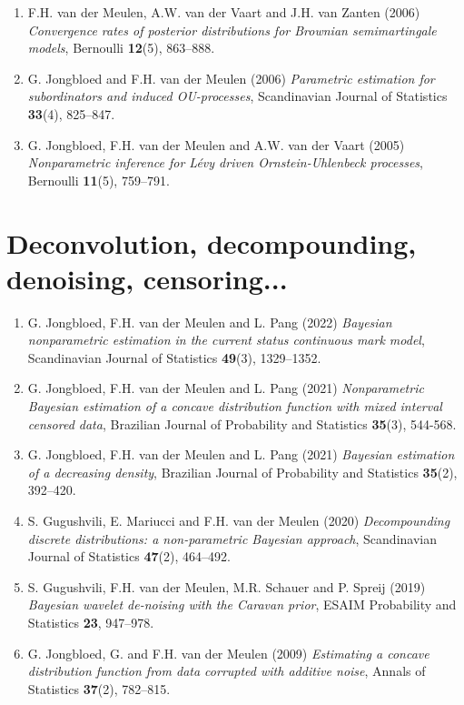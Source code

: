 \documentclass[
10pt, %
a4paper, %
oneside, %
headinclude,footinclude, %
BCOR5mm, %
]{scrartcl}
\begin{document}
\begin{enumerate}
\item {\sc F.H. van der Meulen, A.W. van der Vaart and J.H. van Zanten (2006)} {\it  Convergence rates of posterior distributions for Brownian semimartingale models}, Bernoulli {\bf 12}(5), 863--888.

\item {\sc G. Jongbloed and F.H. van der Meulen (2006)} {\it  Parametric estimation for subordinators and induced OU-processes}, Scandinavian Journal of Statistics {\bf 33}(4), 825--847.

\item {\sc G. Jongbloed, F.H. van der Meulen and A.W. van der Vaart (2005)} {\it   Nonparametric inference for L\'evy driven Ornstein-Uhlenbeck processes}, Bernoulli {\bf 11}(5), 759--791.

\end{enumerate}

\section{Deconvolution, decompounding, denoising, censoring...}

\begin{enumerate}

\item {\sc G. Jongbloed, F.H. van der Meulen and L. Pang (2022)} {\it  Bayesian nonparametric estimation in the current status continuous mark model}, Scandinavian Journal of Statistics {\bf 49}(3), 1329--1352.




\item {\sc G. Jongbloed, F.H. van der Meulen and L. Pang (2021)} {\it  Nonparametric Bayesian estimation of a concave distribution function with mixed interval censored data},  Brazilian Journal of Probability and Statistics {\bf 35}(3), 544-568.
\item {\sc G. Jongbloed, F.H. van der Meulen and L. Pang (2021)} {\it  Bayesian estimation of a decreasing density}, Brazilian Journal of Probability and Statistics {\bf  35}(2), 392--420.

\item {\sc S. Gugushvili, E. Mariucci and F.H. van der Meulen (2020)} {\it  Decompounding discrete distributions: a non-parametric Bayesian approach}, Scandinavian Journal of Statistics {\bf 47}(2), 464--492.

\item {\sc S. Gugushvili, F.H. van der Meulen, M.R. Schauer and P. Spreij (2019)} {\it  Bayesian wavelet de-noising with the Caravan prior}, ESAIM Probability and Statistics {\bf 23}, 947--978.

\item {\sc G. Jongbloed, G. and F.H. van der Meulen (2009)} {\it  Estimating a concave distribution function from data corrupted with additive noise},  Annals of Statistics {\bf 37}(2), 782--815. 

\end{enumerate}
\end{document}
